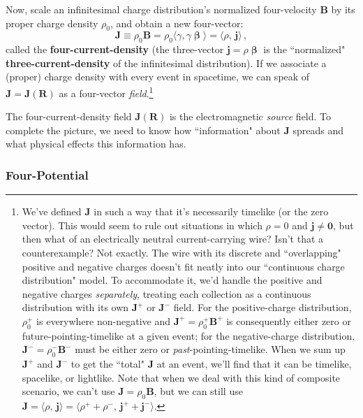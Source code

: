 \documentclass[12pt]{article}
\renewcommand{\vv}[1]{\mathbf{#1}}
\newcommand{\vvbeta}{\bm{\upbeta}}
\begin{document}
Now, scale an infinitesimal charge distribution's normalized four-velocity $\vv B$ by its proper charge density $\rho_0$, and obtain a new four-vector:
\begin{equation}\label{eq:fc}
\boxed{ \vv J \equiv \rho_0 \vv B = \rho_0 \langle \gamma , \gamma \vvbeta \rangle = \langle \rho, \, \vv j \rangle } \, ,
\end{equation}
called the \textbf{four-current-density} (the three-vector $\vv j = \rho \vvbeta$ is the ``normalized" \textbf{three-current-density} of the infinitesimal distribution). If we associate a (proper) charge density with every event in spacetime, we can speak of $\vv J = \vv J (\vv R)$ as a four-vector \emph{field}.\footnote{We've defined $\vv J$ in such a way that it's necessarily timelike (or the zero vector). This would seem to rule out situations in which $\rho = 0$ and $\vv j \neq \vv 0$, but then what of an electrically neutral current-carrying wire? Isn't that a counterexample? Not exactly. The wire with its discrete and ``overlapping" positive and negative charges doesn't fit neatly into our ``continuous charge distribution" model. To accommodate it, we'd handle the positive and negative charges \emph{separately}, treating each collection as a continuous distribution with its own $\vv J^+$ or $\vv J^-$ field. For the positive-charge distribution, $\rho_0^+$ is everywhere non-negative and $\vv J^+ = \rho_0^+ \vv B^+$ is consequently either zero or future-pointing-timelike at a given event; for the negative-charge distribution, $\vv J^- = \rho_0^- \vv B^-$ must be either zero or \emph{past}-pointing-timelike. When we sum up $\vv J^+$ and $\vv J^-$ to get the ``total" $\vv J$ at an event, we'll find that it can be timelike, spacelike, or lightlike. Note that when we deal with this kind of composite scenario, we can't use $\vv J = \rho_0 \vv B$, but we can still use $\vv J = \langle \rho, \, \vv j \rangle = \langle \rho^+ + \rho^- , \, \vv j^+ + \vv j^- \rangle $.}

The four-current-density field $\vv J (\vv R)$ is the electromagnetic \emph{source} field. To complete the picture, we need to know how ``information" about $\vv J$ spreads and what physical effects this information has.


\subsubsection{Four-Potential}
\end{document}

